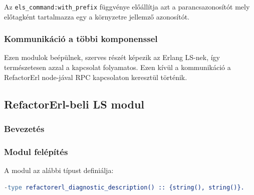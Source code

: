 Az \lstinline{els_command:with_prefix} függvénye előállítja azt a parancsazonosítót mely előtagként tartalmazza egy a környzetre jellemző azonosítót.

\subsubsection{Kommunikáció a többi komponenssel}

Ezen modulok beépülnek, szerves részét képezik az Erlang LS-nek, így természetesen azzal a kapcsolat folyamatos. Ezen kívül a kommunikáció a RefactorErl node-jával RPC kapcsolaton keresztül történik. 

\subsection{RefactorErl-beli LS modul}
\subsubsection{Bevezetés}
\subsubsection{Modul felépítés}

\noindent A modul az alábbi típust definiálja: 
 
\begin{lstlisting}[language={erlang}]
-type refactorerl_diagnostic_description() :: {string(), string()}.
\end{lstlisting}
 






